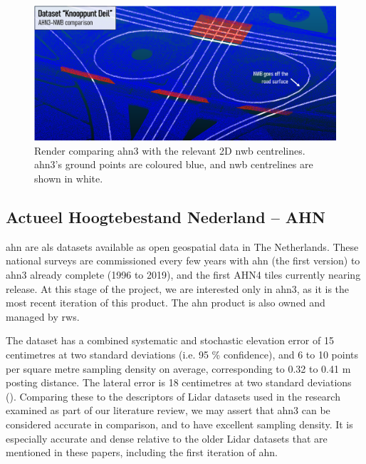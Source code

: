 \begin{figure}
    \centering
    \includegraphics[width=\linewidth]{final_report/figs/ahn_sample_04_a.png} 
    \caption[Comparison of AHN3 with some relevant NWB centrelines]{Render comparing \ac{ahn3} with the relevant 2D \ac{nwb} centrelines. \ac{ahn3}'s ground points are coloured blue, and \ac{nwb} centrelines are shown in white.}
    \label{fig:ahnnwb}
\end{figure}

\subsection{Actueel Hoogtebestand Nederland – AHN}
\label{sub:ahn}

\ac{ahn} are \ac{als} datasets available as open geospatial data in The Netherlands. These national surveys are commissioned every few years with \ac{ahn} (the first version) to \ac{ahn3} already complete (1996 to 2019), and the first AHN4 tiles currently nearing release. At this stage of the project, we are interested only in \ac{ahn3}, as it is the most recent iteration of this product. The \ac{ahn} product is also owned and managed by \ac{rws}.

The dataset has a combined systematic and stochastic elevation error of 15 centimetres at two standard deviations (i.e. 95 \% confidence), and 6 to 10 points per square metre sampling density on average, corresponding to 0.32 to 0.41 m posting distance. The lateral error is 18 centimetres at two standard deviations (\cite{ahn_kwaliteit}). Comparing these to the descriptors of Lidar datasets used in the research examined as part of our literature review, we may assert that \ac{ahn3} can be considered accurate in comparison, and to have excellent sampling density. It is especially accurate and dense relative to the older Lidar datasets that are mentioned in these papers, including the first iteration of \ac{ahn}.

